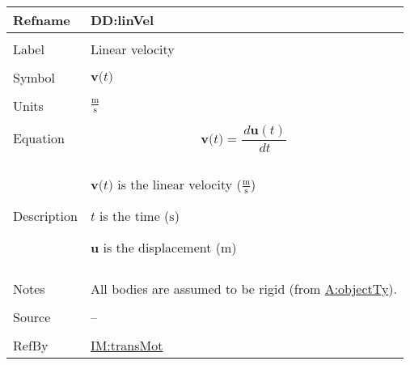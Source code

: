 \documentclass[12pt]{article}
\begin{document}
\vspace{\baselineskip}
\noindent
\begin{minipage}{\textwidth}
\begin{tabular}{>{\raggedright}p{}>{\raggedright\arraybackslash}p{}}
\toprule \textbf{Refname} & \textbf{DD:linVel}
\label{DD:linVel}
\\ \midrule \\
Label & Linear velocity
        
\\ \midrule \\
Symbol & $\symbf{v}\text{(}t\text{)}$
         
\\ \midrule \\
Units & $\frac{\text{m}}{\text{s}}$
        
\\ \midrule \\
Equation & \begin{displaymath}
           \symbf{v}\text{(}t\text{)}=\frac{\,d\symbf{u}\left(t\right)}{\,dt}
           \end{displaymath}
\\ \midrule \\
Description & \begin{symbDescription}
              \item{$\symbf{v}\text{(}t\text{)}$ is the linear velocity ($\frac{\text{m}}{\text{s}}$)}
              \item{$t$ is the time (${\text{s}}$)}
              \item{$\symbf{u}$ is the displacement (${\text{m}}$)}
              \end{symbDescription}
\\ \midrule \\
Notes & All bodies are assumed to be rigid (from \hyperref[assumpOT]{A:objectTy}).
        
\\ \midrule \\
Source & --
         
\\ \midrule \\
RefBy & \hyperref[IM:transMot]{IM:transMot}
        
\\ \bottomrule
\end{tabular}
\end{minipage}
\end{document}
